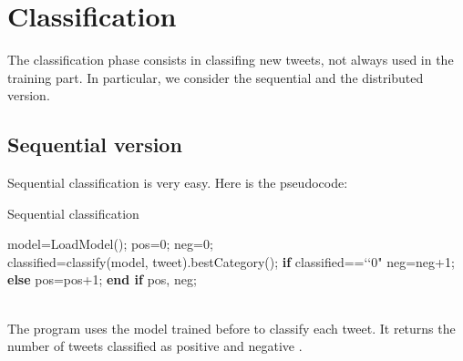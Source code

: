 \documentclass[10pt,twocolumn,letterpaper]{article}
\begin{document}
\section{Classification}
The classification phase consists in classifing new tweets, not always used in the training part. In particular, we consider the sequential and the distributed version.
\subsection{Sequential version}
Sequential classification is very easy. Here is the pseudocode:\\
\begin{algorithm}
\label{Sequential classification}
\caption{Sequential classification}
\begin{algorithmic}
\State model=LoadModel();
\State pos=0;
\State neg=0;
    	 \do \\
		\State classified=classify(model, tweet).bestCategory();
		\State \textbf{if}  classified==\lq\lq0"
			\State\hspace{\algorithmicindent} neg=neg+1;
		\State \textbf{else} 
		\State\hspace{\algorithmicindent}pos=pos+1;
		\State \textbf{end if} 
	\EndFor 	
\State \Return pos, neg;
\end{algorithmic}
\end{algorithm} \\
The program uses the model trained before to classify each tweet. It returns the number of tweets classified as positive and negative .
\end{document}
